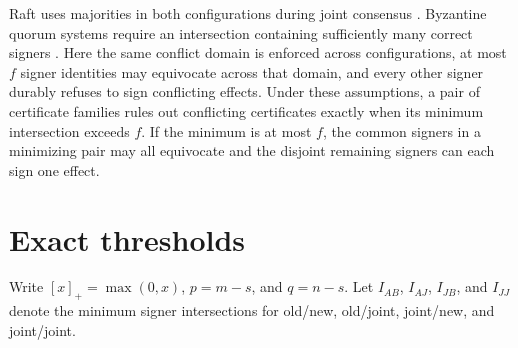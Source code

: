 \documentclass[11pt]{article}
\begin{document}
Raft uses majorities in both configurations during joint consensus
\cite{raft}. Byzantine quorum systems require an intersection
containing sufficiently many correct signers \cite{malkhi}.
Here the same conflict domain is enforced across configurations,
at most $f$ signer identities may equivocate across that domain,
and every other signer durably refuses to sign conflicting
effects. Under these assumptions, a pair of certificate families
rules out conflicting certificates exactly when its minimum
intersection exceeds $f$. If the minimum is at most $f$, the
common signers in a minimizing pair may all equivocate and the
disjoint remaining signers can each sign one effect.

\section{Exact thresholds}
Write $[x]_+=\max(0,x)$, $p=m-s$, and $q=n-s$. Let $I_{AB}$,
$I_{AJ}$, $I_{JB}$, and $I_{JJ}$ denote the minimum signer
intersections for old/new, old/joint, joint/new, and joint/joint.
\end{document}
